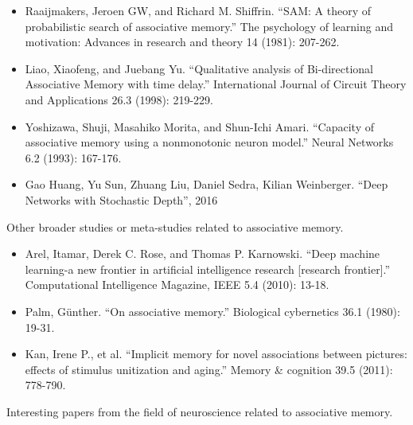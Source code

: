 \documentclass[12pt, a4paper]{article}
\begin{document}
\begin{itemize}
	\item Raaijmakers, Jeroen GW, and Richard M. Shiffrin. ``SAM: A theory of probabilistic search of associative memory.'' The psychology of learning and motivation: Advances in research and theory 14 (1981): 207-262.
	\item Liao, Xiaofeng, and Juebang Yu. ``Qualitative analysis of Bi-directional Associative Memory with time delay.'' International Journal of Circuit Theory and Applications 26.3 (1998): 219-229.
	\item Yoshizawa, Shuji, Masahiko Morita, and Shun-Ichi Amari. ``Capacity of associative memory using a nonmonotonic neuron model.'' Neural Networks 6.2 (1993): 167-176.
	\item Gao Huang, Yu Sun, Zhuang Liu, Daniel Sedra, Kilian Weinberger. ``Deep Networks with Stochastic Depth'', 2016
\end{itemize}

Other broader studies or meta-studies related to associative memory.

\begin{itemize}
\item Arel, Itamar, Derek C. Rose, and Thomas P. Karnowski. ``Deep machine learning-a new frontier in artificial intelligence research [research frontier].'' Computational Intelligence Magazine, IEEE 5.4 (2010): 13-18.
\item Palm, Günther. ``On associative memory.'' Biological cybernetics 36.1 (1980): 19-31.
\item Kan, Irene P., et al. ``Implicit memory for novel associations between pictures: effects of stimulus unitization and aging.'' Memory \& cognition 39.5 (2011): 778-790.
\end{itemize}

Interesting papers from the field of neuroscience related to associative memory.
\end{document}

